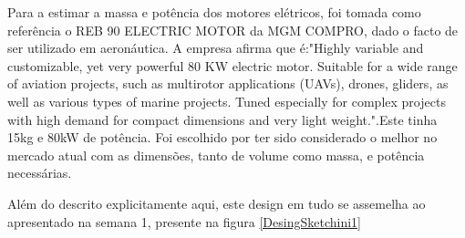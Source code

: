 Para a estimar a massa e potência dos motores elétricos, foi tomada como referência o REB 90 ELECTRIC MOTOR da MGM COMPRO, dado o facto de ser utilizado em aeronáutica. A empresa afirma que é:"Highly variable and customizable, yet very powerful 80 KW electric motor. Suitable for a wide range of aviation projects, such as multirotor applications (UAVs), drones, gliders, as well as various types of marine projects. Tuned especially for complex projects with high demand for compact dimensions and very light weight.".\cite{noauthor_2021-ym}Este tinha 15kg e 80kW de potência\cite{noauthor_2021-ym}. Foi escolhido por ter sido considerado o melhor no mercado atual com as dimensões, tanto de volume como massa, e potência necessárias.\par
Além do descrito explicitamente aqui, este design em tudo se assemelha ao apresentado na semana 1, presente na figura \ref{DesingSketchini1}
